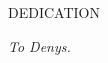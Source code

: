 \newpage
{}

\begin{center}
DEDICATION
\end{center}

\begin{center}
\textit{To Denys.}
\end{center}
